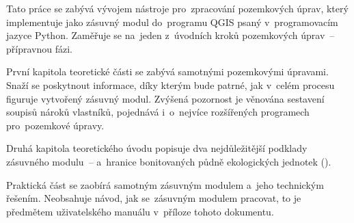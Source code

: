 Tato práce se zabývá vývojem nástroje pro~zpracování pozemkových úprav, který implementuje jako zásuvný modul do~programu QGIS psaný v~programovacím jazyce Python. Zaměřuje se na~jeden z~úvodních kroků pozemkových úprav~– přípravnou fázi.

První kapitola teoretické části se zabývá samotnými pozemkovými úpravami. Snaží se poskytnout informace, díky kterým bude patrné, jak v~celém procesu figuruje vytvořený zásuvný modul. Zvýšená pozornost je věnována sestavení soupisů nároků vlastníků, pojednává i~o~nejvíce rozšířených programech pro~pozemkové úpravy.

Druhá kapitola teoretického úvodu popisuje dva nejdůležitější podklady zásuvné\-ho modulu~–  a~hranice bonitovaných půdně ekologických jednotek ().

Praktická část se zaobírá samotným zásuvným modulem a~jeho technickým řešením. Neobsahuje návod, jak se~zásuvným modulem pracovat, to je předmětem uživatelského manuálu v~příloze tohoto dokumentu.

